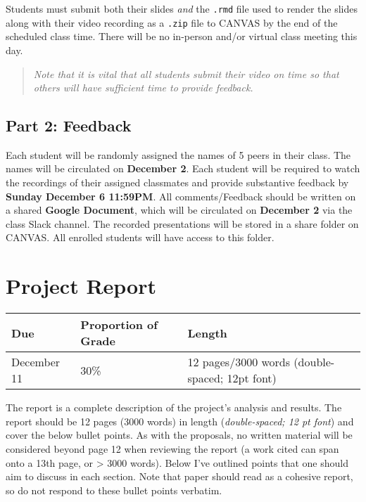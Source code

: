 \documentclass[
  12pt,
]{article}
\begin{document}
Students must submit both their slides \emph{and} the \texttt{.rmd} file
used to render the slides along with their video recording as a
\texttt{.zip} file to CANVAS by the end of the scheduled class time.
There will be no in-person and/or virtual class meeting this day.

\begin{quote}
\emph{Note that it is vital that all students submit their video on time
so that others will have sufficient time to provide feedback.}
\end{quote}

\hypertarget{part-2-feedback}{%
\subsection{Part 2: Feedback}\label{part-2-feedback}}

Each student will be randomly assigned the names of 5 peers in their
class. The names will be circulated on \textbf{December 2}. Each student
will be required to watch the recordings of their assigned classmates
and provide substantive feedback by \textbf{Sunday December 6 11:59PM}.
All comments/Feedback should be written on a shared \textbf{Google
Document}, which will be circulated on \textbf{December 2} via the class
Slack channel. The recorded presentations will be stored in a share
folder on CANVAS. All enrolled students will have access to this folder.

\hypertarget{project-report}{%
\section{Project Report}\label{project-report}}

\begin{longtable}[]{@{}lll@{}}
\toprule
\textbf{Due} & \textbf{Proportion of Grade} &
\textbf{Length}\tabularnewline
\midrule
\endhead
December 11 & 30\% & 12 pages/3000 words (double-spaced; 12pt
font)\tabularnewline
\bottomrule
\end{longtable}

The report is a complete description of the project's analysis and
results. The report should be 12 pages (3000 words) in length
(\emph{double-spaced; 12 pt font}) and cover the below bullet points. As
with the proposals, no written material will be considered beyond page
12 when reviewing the report (a work cited can span onto a 13th page, or
\textgreater{} 3000 words). Below I've outlined points that one should
aim to discuss in each section. Note that paper should read as a
cohesive report, so do not respond to these bullet points verbatim.
\end{document}
